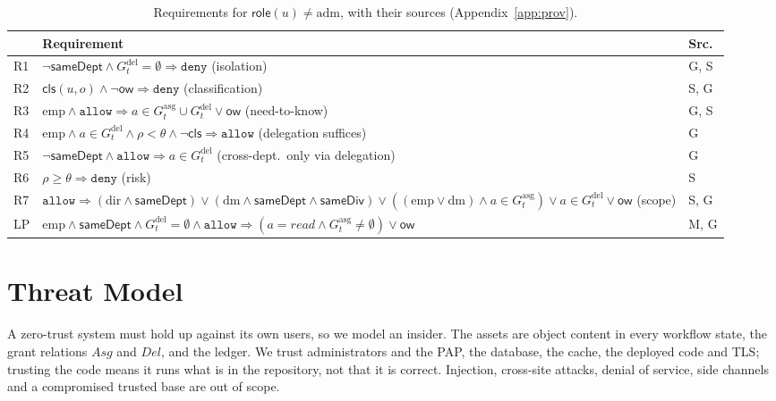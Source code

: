 \documentclass[sigconf,review,anonymous]{acmart}
\newcommand{\ow}{\mathsf{ow}}
\newcommand{\Gasg}{G^{\mathrm{asg}}}
\newcommand{\Gdel}{G^{\mathrm{del}}}
\newcommand{\sameDept}{\mathsf{sameDept}}
\newcommand{\sameDiv}{\mathsf{sameDiv}}
\newcommand{\role}{\mathsf{role}}
\newcommand{\allowv}{\mathtt{allow}}
\newcommand{\denyv}{\mathtt{deny}}
\newcommand{\emp}{\mathrm{emp}}
\begin{document}
\begin{table}[t]
\caption{Requirements for $\role(u)\neq\mathrm{adm}$, with their sources (Appendix~\ref{app:prov}).}
\label{tab:req}
\small
\begin{tabularx}{\columnwidth}{@{}l@{\;}>{\raggedright\arraybackslash}X@{\;}l@{}}
\toprule
 & Requirement & Src. \\
\midrule
R1 & $\neg\sameDept\wedge\Gdel_t=\emptyset\Rightarrow\denyv$ (isolation) & G, S \\
R2 & $\mathsf{cls}(u,o)\wedge\neg\ow\Rightarrow\denyv$ (classification) & S, G \\
R3 & $\emp\wedge\allowv\Rightarrow a\in\Gasg_t\cup\Gdel_t\vee\ow$ (need-to-know) & G, S \\
R4 & $\emp\wedge a\in\Gdel_t\wedge\rho<\theta\wedge\neg\mathsf{cls}\Rightarrow\allowv$ (delegation suffices) & G \\
R5 & $\neg\sameDept\wedge\allowv\Rightarrow a\in\Gdel_t$ (cross-dept.\ only via delegation) & G \\
R6 & $\rho\ge\theta\Rightarrow\denyv$ (risk) & S \\
R7 & $\allowv\Rightarrow(\mathrm{dir}\wedge\sameDept)\vee(\mathrm{dm}\wedge\sameDept\wedge\sameDiv)\vee((\emp\vee\mathrm{dm})\wedge a\in\Gasg_t)\vee a\in\Gdel_t\vee\ow$ (scope) & S, G \\
\midrule
LP & $\emp\wedge\sameDept\wedge\Gdel_t=\emptyset\wedge\allowv\Rightarrow(a=\mathit{read}\wedge\Gasg_t\neq\emptyset)\vee\ow$ & M, G \\
\bottomrule
\end{tabularx}
\end{table}

\section{Threat Model}
\label{sec:threat}

A zero-trust system must hold up against its own users, so we model an insider. The assets are object content
in every workflow state, the grant relations $\mathit{Asg}$ and $\mathit{Del}$, and the ledger. We trust administrators and the PAP, the database,
the cache, the deployed code and TLS; trusting the code means it runs what is in the repository, not that it is
correct. Injection, cross-site attacks, denial of service, side channels and a compromised trusted base are out
of scope.
\end{document}
